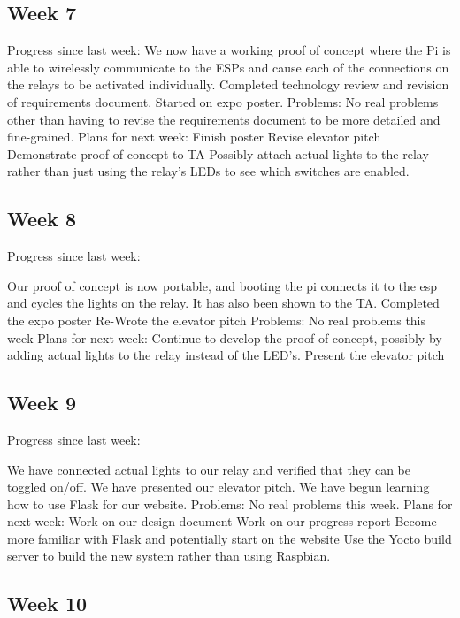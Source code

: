 \documentclass[letterpaper,10pt]{article}
\begin{document}
\subsection{Week 7}
 
Progress since last week: 
We now have a working proof of concept where the Pi is able to wirelessly communicate to the ESPs and cause each of the connections on the relays to be activated individually. 
Completed technology review and revision of requirements document. 
Started on expo poster. 
Problems: 
No real problems other than having to revise the requirements document to be more detailed and fine-grained. 
Plans for next week: 
Finish poster 
Revise elevator pitch 
Demonstrate proof of concept to TA 
Possibly attach actual lights to the relay rather than just using the relay's LEDs to see which switches are enabled. 

\subsection{Week 8}
 
Progress since last week: 
 
Our proof of concept is now portable, and booting the pi connects it to the esp and cycles the lights on the relay. It has also been shown to the TA. 
Completed the expo poster 
Re-Wrote the elevator pitch 
Problems: 
No real problems this week 
Plans for next week: 
Continue to develop the proof of concept, possibly by adding actual lights to the relay instead of the LED's. 
Present the elevator pitch 

\subsection{Week 9}
 
Progress since last week: 
 
We have connected actual lights to our relay and verified that they can be toggled on/off. 
We have presented our elevator pitch. 
We have begun learning how to use Flask for our website. 
Problems: 
No real problems this week. 
Plans for next week: 
Work on our design document 
Work on our progress report 
Become more familiar with Flask and potentially start on the website 
Use the Yocto build server to build the new system rather than using Raspbian. 

\subsection{Week 10}
\end{document}
